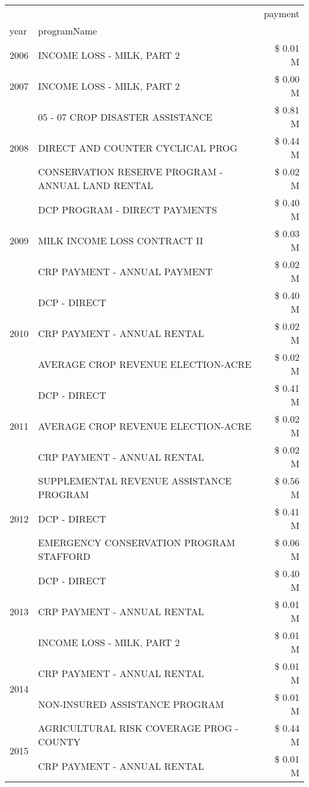 \begin{tabular}{llr}
\toprule
 &  & payment \\
year & programName &  \\
\midrule
2006 & INCOME LOSS - MILK, PART 2 & \$ 0.01 M \\
\cline{1-3}
2007 & INCOME LOSS - MILK, PART 2 & \$ 0.00 M \\
\cline{1-3}
\multirow[t]{3}{*}{2008} & 05 - 07 CROP DISASTER ASSISTANCE & \$ 0.81 M \\
 & DIRECT AND COUNTER CYCLICAL PROG & \$ 0.44 M \\
 & CONSERVATION RESERVE PROGRAM - ANNUAL LAND RENTAL & \$ 0.02 M \\
\cline{1-3}
\multirow[t]{3}{*}{2009} & DCP PROGRAM - DIRECT PAYMENTS & \$ 0.40 M \\
 & MILK INCOME LOSS CONTRACT II & \$ 0.03 M \\
 & CRP PAYMENT - ANNUAL PAYMENT & \$ 0.02 M \\
\cline{1-3}
\multirow[t]{3}{*}{2010} & DCP - DIRECT & \$ 0.40 M \\
 & CRP PAYMENT - ANNUAL RENTAL & \$ 0.02 M \\
 & AVERAGE CROP REVENUE ELECTION-ACRE & \$ 0.02 M \\
\cline{1-3}
\multirow[t]{3}{*}{2011} & DCP - DIRECT & \$ 0.41 M \\
 & AVERAGE CROP REVENUE ELECTION-ACRE & \$ 0.02 M \\
 & CRP PAYMENT - ANNUAL RENTAL & \$ 0.02 M \\
\cline{1-3}
\multirow[t]{3}{*}{2012} & SUPPLEMENTAL REVENUE ASSISTANCE PROGRAM & \$ 0.56 M \\
 & DCP - DIRECT & \$ 0.41 M \\
 & EMERGENCY CONSERVATION PROGRAM STAFFORD & \$ 0.06 M \\
\cline{1-3}
\multirow[t]{3}{*}{2013} & DCP - DIRECT & \$ 0.40 M \\
 & CRP PAYMENT - ANNUAL RENTAL & \$ 0.01 M \\
 & INCOME LOSS - MILK, PART 2 & \$ 0.01 M \\
\cline{1-3}
\multirow[t]{2}{*}{2014} & CRP PAYMENT - ANNUAL RENTAL & \$ 0.01 M \\
 & NON-INSURED ASSISTANCE PROGRAM & \$ 0.01 M \\
\cline{1-3}
\multirow[t]{2}{*}{2015} & AGRICULTURAL RISK COVERAGE PROG - COUNTY & \$ 0.44 M \\
 & CRP PAYMENT - ANNUAL RENTAL & \$ 0.01 M \\

\end{tabular}
